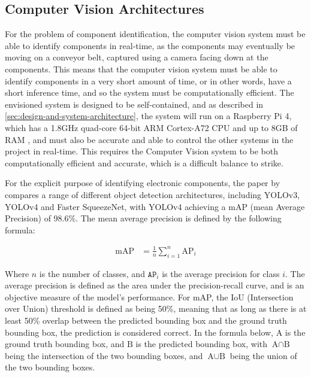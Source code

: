 \subsection{Computer Vision Architectures}
\label{sec:background-computer-vision}
For the problem of component identification, the computer vision system must be able to identify components in real-time, as the components may eventually be moving on a conveyor belt, captured using a camera facing down at the components. This means that the computer vision system must be able to identify components in a very short amount of time, or in other words, have a short inference time, and so the system must be computationally efficient. The envisioned system is designed to be self-contained, and as described in \autoref{sec:design-and-system-architecture}, the system will run on a Raspberry Pi 4, which has a 1.8GHz quad-core 64-bit ARM Cortex-A72 CPU and up to 8GB of RAM \cite{pi4}, and must also be accurate and able to control the other systems in the project in real-time. This requires the Computer Vision system to be both computationally efficient and accurate, which is a difficult balance to strike.

For the explicit purpose of identifying electronic components, the paper by \citet{s22239079} compares a range of different object detection architectures, including YOLOv3, YOLOv4 and Faster SqueezeNet, with YOLOv4 achieving a mAP (mean Average Precision) of 98.6\%. The mean average precision is defined by the following formula:

{\fontsize{14pt}{11pt}\selectfont
\begin{align*}
    \text{mAP} &= \frac{1}{n} \sum_{i=1}^{n} \text{AP}_i %
\end{align*}
}

Where $n$ is the number of classes, and $\texttt{AP}_i$ is the average precision for class $i$. The average precision is defined as the area under the precision-recall curve, and is an objective measure of the model's performance. For mAP, the IoU (Intersection over Union) threshold is defined as being 50\%, meaning that as long as there is at least 50\% overlap between the predicted bounding box and the ground truth bounding box, the prediction is considered correct. In the formula below, $\text{A}$ is the ground truth bounding box, and $\text{B}$ is the predicted bounding box, with $\text{A} \cap \text{B}$ being the intersection of the two bounding boxes, and $\text{A} \cup \text{B}$ being the union of the two bounding boxes.

